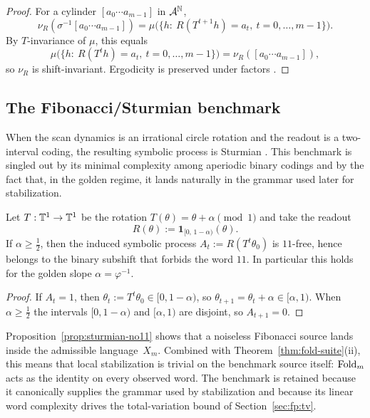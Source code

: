 \begin{proof}
For a cylinder $[a_0\cdots a_{m-1}]$ in $\mathcal{A}^{\mathbb{N}}$,
\[
\nu_R(\sigma^{-1}[a_0\cdots a_{m-1}])
=\mu\bigl(\{h:\ R(T^{t+1}h)=a_t,\ t=0,\dots,m-1\}\bigr).
\]
By $T$-invariance of $\mu$, this equals
\[
\mu\bigl(\{h:\ R(T^{t}h)=a_t,\ t=0,\dots,m-1\}\bigr)=\nu_R([a_0\cdots a_{m-1}]),
\]
so $\nu_R$ is shift-invariant. Ergodicity is preserved under factors \cite{Walters1982}.
\end{proof}

\subsection{The Fibonacci/Sturmian benchmark}\label{sec:readout:sturmian}

When the scan dynamics is an irrational circle rotation and the readout is a two-interval coding, the resulting symbolic process is Sturmian \cite{MorseHedlund1940,Lothaire2002,Queffelec2010}. This benchmark is singled out by its minimal complexity among aperiodic binary codings and by the fact that, in the golden regime, it lands naturally in the grammar used later for stabilization.

\begin{proposition}\label{prop:sturmian-no11}
Let $T:\mathbb{T}^1\to\mathbb{T}^1$ be the rotation $T(\theta)=\theta+\alpha\pmod{1}$ and take the readout
\[
R(\theta):=\mathbf{1}_{[0,\,1-\alpha)}(\theta).
\]
If $\alpha\ge \tfrac12$, then the induced symbolic process $A_t:=R(T^t\theta_0)$ is $11$-free, hence belongs to the binary subshift that forbids the word $11$. In particular this holds for the golden slope $\alpha=\varphi^{-1}$.
\end{proposition}

\begin{proof}
If $A_t=1$, then $\theta_t:=T^t\theta_0\in[0,1-\alpha)$, so $\theta_{t+1}=\theta_t+\alpha\in[\alpha,1)$. When $\alpha\ge\tfrac12$ the intervals $[0,1-\alpha)$ and $[\alpha,1)$ are disjoint, so $A_{t+1}=0$.
\end{proof}

\begin{remark}
Proposition~\ref{prop:sturmian-no11} shows that a noiseless Fibonacci source lands inside the admissible language~$X_m$. Combined with Theorem~\ref{thm:fold-suite}(ii), this means that local stabilization is trivial on the benchmark source itself: $\mathrm{Fold}_m$ acts as the identity on every observed word. The benchmark is retained because it canonically supplies the grammar used by stabilization and because its linear word complexity drives the total-variation bound of Section~\ref{sec:fp:tv}.
\end{remark}


